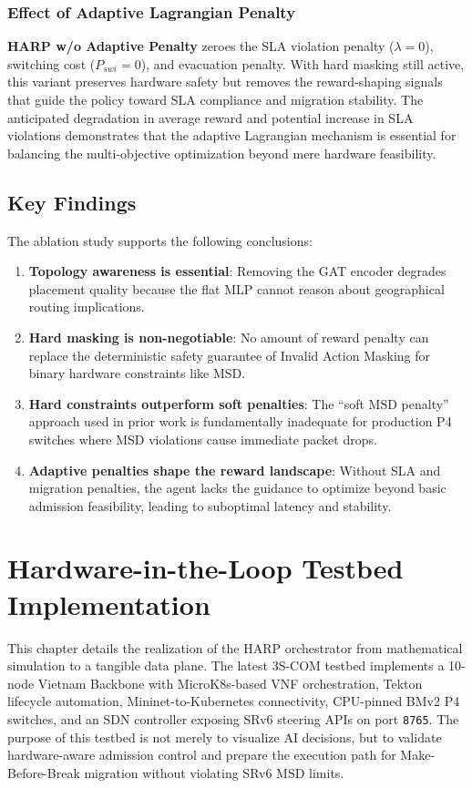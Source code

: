 \documentclass[12pt, a4paper, reqno, oneside]{book}
\begin{document}
\subsubsection{Effect of Adaptive Lagrangian Penalty}
\textbf{HARP w/o Adaptive Penalty} zeroes the SLA violation penalty ($\lambda = 0$), switching cost ($P_{swi} = 0$), and evacuation penalty. With hard masking still active, this variant preserves hardware safety but removes the reward-shaping signals that guide the policy toward SLA compliance and migration stability. The anticipated degradation in average reward and potential increase in SLA violations demonstrates that the adaptive Lagrangian mechanism is essential for balancing the multi-objective optimization beyond mere hardware feasibility.

\subsection{Key Findings}
The ablation study supports the following conclusions:
\begin{enumerate}
    \item \textbf{Topology awareness is essential}: Removing the GAT encoder degrades placement quality because the flat MLP cannot reason about geographical routing implications.
    \item \textbf{Hard masking is non-negotiable}: No amount of reward penalty can replace the deterministic safety guarantee of Invalid Action Masking for binary hardware constraints like MSD.
    \item \textbf{Hard constraints outperform soft penalties}: The ``soft MSD penalty'' approach used in prior work is fundamentally inadequate for production P4 switches where MSD violations cause immediate packet drops.
    \item \textbf{Adaptive penalties shape the reward landscape}: Without SLA and migration penalties, the agent lacks the guidance to optimize beyond basic admission feasibility, leading to suboptimal latency and stability.
\end{enumerate}

\section{Hardware-in-the-Loop Testbed Implementation}
\label{chap:testbed}

This chapter details the realization of the HARP orchestrator from mathematical simulation to a tangible data plane. The latest 3S-COM testbed implements a 10-node Vietnam Backbone with MicroK8s-based VNF orchestration, Tekton lifecycle automation, Mininet-to-Kubernetes connectivity, CPU-pinned BMv2 P4 switches, and an SDN controller exposing SRv6 steering APIs on port \texttt{8765}. The purpose of this testbed is not merely to visualize AI decisions, but to validate hardware-aware admission control and prepare the execution path for Make-Before-Break migration without violating SRv6 MSD limits.
\end{document}
